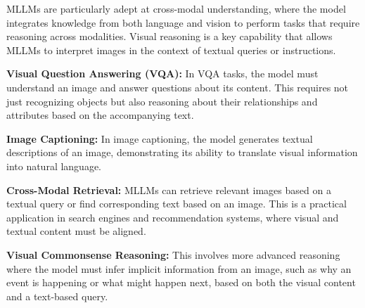 MLLMs are particularly adept at cross-modal understanding, where the model integrates knowledge from both language and vision to perform tasks that require reasoning across modalities. Visual reasoning is a key capability that allows MLLMs to interpret images in the context of textual queries or instructions.

\textbf{Visual Question Answering (VQA):} In VQA tasks, the model must understand an image and answer questions about its content. This requires not just recognizing objects but also reasoning about their relationships and attributes based on the accompanying text.

\textbf{Image Captioning:} In image captioning, the model generates textual descriptions of an image, demonstrating its ability to translate visual information into natural language.

\textbf{Cross-Modal Retrieval:} MLLMs can retrieve relevant images based on a textual query or find corresponding text based on an image. This is a practical application in search engines and recommendation systems, where visual and textual content must be aligned.

\textbf{Visual Commonsense Reasoning:} This involves more advanced reasoning where the model must infer implicit information from an image, such as why an event is happening or what might happen next, based on both the visual content and a text-based query.
